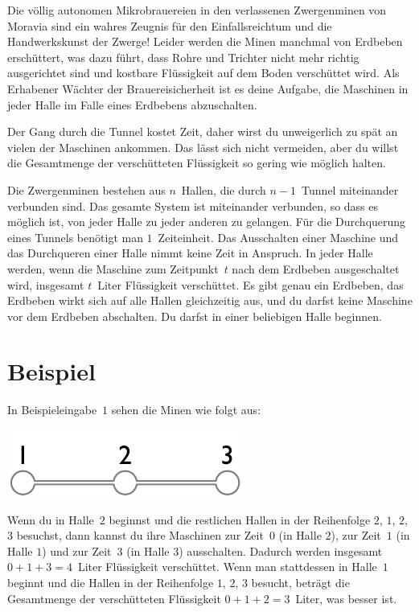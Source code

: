 
\noindent
Die völlig autonomen Mikrobrauereien in den verlassenen Zwergenminen von Moravia sind ein wahres Zeugnis für den Einfallsreichtum und die Handwerkskunst der Zwerge!
Leider werden die Minen manchmal von Erdbeben erschüttert, was dazu führt, dass Rohre und Trichter nicht mehr richtig ausgerichtet sind und kostbare Flüssigkeit auf dem Boden verschüttet wird.
Als Erhabener Wächter der Brauereisicherheit ist es deine Aufgabe, die Maschinen in jeder Halle im Falle eines Erdbebens abzuschalten.

Der Gang durch die Tunnel kostet Zeit, 
daher wirst du unweigerlich zu spät an vielen der Maschinen ankommen.
Das lässt sich nicht vermeiden, aber du willst die Gesamtmenge der verschütteten Flüssigkeit so gering wie möglich halten.

\medskip
Die Zwergenminen bestehen aus $n$~Hallen, die durch $n-1$~Tunnel miteinander verbunden sind.
Das gesamte System ist miteinander verbunden, so dass es möglich ist, von jeder Halle zu jeder anderen zu gelangen.
Für die Durchquerung eines Tunnels benötigt man $1$~Zeiteinheit.
Das Ausschalten einer Maschine und das Durchqueren einer Halle nimmt keine Zeit in Anspruch.
In jeder Halle werden, wenn die Maschine zum Zeitpunkt~$t$ nach dem Erdbeben ausgeschaltet wird, insgesamt $t$~Liter Flüssigkeit verschüttet.
Es gibt genau ein Erdbeben, das Erdbeben wirkt sich auf alle Hallen gleichzeitig aus, und du darfst keine Maschine vor dem Erdbeben abschalten.
Du darfst in einer beliebigen Halle beginnen.

\section*{Beispiel}

In Beispieleingabe~$1$ sehen die Minen wie folgt aus:

\includegraphics[width=.2\textwidth]{img/sample-1.pdf}

Wenn du in Halle~$2$ beginnst und die restlichen Hallen in der Reihenfolge $2$, $1$, $2$, $3$ besuchst, dann kannst du ihre Maschinen zur Zeit~$0$ (in Halle $2$), zur Zeit~$1$ (in Halle $1$) und zur Zeit~$3$ (in Halle $3$) ausschalten.
Dadurch werden insgesamt $0+1+3=4$~Liter Flüssigkeit verschüttet.
Wenn man stattdessen in Halle~$1$ beginnt und die Hallen in der Reihenfolge $1$, $2$, $3$ besucht, beträgt die Gesamtmenge der verschütteten Flüssigkeit $0+1+2=3$~Liter, was besser ist.

